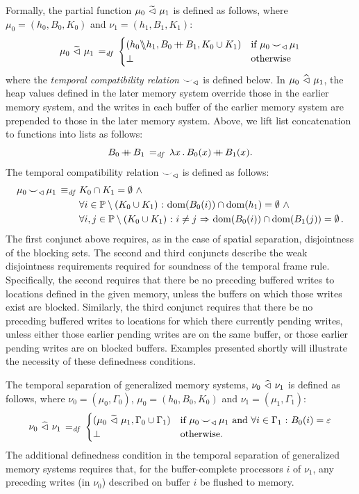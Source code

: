 \documentclass[11pt]{report}
\begin{document}
Formally, the partial function $\mu_0 \operatorname{\,\widetilde{\vartriangleleft}\,} \mu_1$ is defined as follows, where $\mu_0 = (h_0,B_0,K_0)$ and $\nu_1 = (h_1,B_1,K_1)$:
\[ \mu_0 \operatorname{\,\widetilde{\vartriangleleft}\,} \mu_1 \operatorname{\;=_{\mathit{df}}\;} \begin{cases}
  (h_0 \backslash\!\!\backslash h_1, B_0 \operatorname{+\!\!\!+} B_1, K_0 \cup K_1) & \text{if $\mu_0 \operatorname{\smile}_\vartriangleleft \mu_1$} \\ 
  \bot & \text{otherwise}
\end{cases}\] where the \emph{temporal compatibility relation} $\operatorname{\smile}_\vartriangleleft$ is defined below. In $\mu_0 \operatorname{\,\widehat{\vartriangleleft}\,} \mu_1$, the heap values defined in the later memory system override those in the earlier memory system, and the writes in each buffer of the earlier memory system are prepended to those in the later memory system. Above, we lift list concatenation to functions into lists as follows: \[ B_0 \operatorname{+\!\!\!+} B_1 \operatorname{\;=_{\mathit{df}}\;} \lambda x\,.\, B_0(x) \operatorname{+\!\!\!+} B_1(x).\]
The temporal compatibility relation $\operatorname{\smile}_\vartriangleleft$ is defined as follows: 
\begin{align*}
\mu_0 \operatorname{\smile}_\vartriangleleft \mu_1 \operatorname{\;\equiv_{\mathit{df}}\;} & K_0 \cap K_1 = \operatorname{\emptyset} \operatorname{\,\wedge\,} \\ 
  & \forall i \in \mathbb{P} \setminus (K_0 \cup K_1) \operatorname{\,:\,} \operatorname{\mathrm{dom}}(B_0(i)) \cap \operatorname{\mathrm{dom}}(h_1) = \operatorname{\emptyset} \operatorname{\,\wedge\,} \\  
  & \forall i,j \in \mathbb{P} \setminus (K_0 \cup K_1) \operatorname{\,:\,} i \neq j \operatorname{\,\Rightarrow\,} \operatorname{\mathrm{dom}}(B_0(i)) \cap \operatorname{\mathrm{dom}}(B_1(j)) = \operatorname{\emptyset}. 
\end{align*} The first conjunct above requires, as in the case of spatial separation, disjointness of the blocking sets. The second and third conjuncts describe the weak disjointness requirements required for soundness of the temporal frame rule. Specifically, the second requires that there be no preceding buffered writes to locations defined in the given memory, unless the buffers on which those writes exist are blocked. Similarly, the third conjunct requires that there be no preceding buffered writes to locations for which there currently pending writes, unless either those earlier pending writes are on the same buffer, or those earlier pending writes are on blocked buffers. Examples presented shortly will illustrate the necessity of these definedness conditions. 

The temporal separation of generalized memory systems, $\nu_0 \operatorname{\,\widehat{\vartriangleleft}\,} \nu_1$ is defined as follows, where $\nu_0 = (\mu_0,\Gamma_0)$, $\mu_0 = (h_0,B_0,K_0)$ and $\nu_1 = (\mu_1,\Gamma_1)$: \[ \nu_0 \operatorname{\,\widehat{\vartriangleleft}\,} \nu_1 \operatorname{\;=_{\mathit{df}}\;} \begin{cases}
  (\mu_0 \operatorname{\,\widetilde{\vartriangleleft}\,} \mu_1,\Gamma_0 \cup \Gamma_1) & \text{if $\mu_0 \operatorname{\smile}_\vartriangleleft \mu_1$ and $\forall i \in \Gamma_1 \operatorname{\,:\,} B_0(i) = \varepsilon$} \\ 
  \bot & \text{otherwise.}
\end{cases}\] The additional definedness condition in the temporal separation of generalized memory systems requires that, for the buffer-complete processors $i$ of $\nu_1$, any preceding writes (in $\nu_0$) described on buffer $i$ be flushed to memory.
\end{document}
